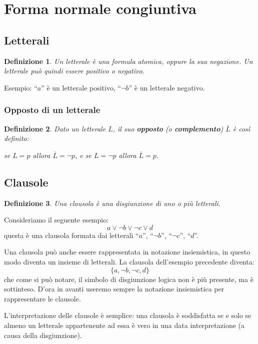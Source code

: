 \documentclass[a4paper,12pt]{report}
\newtheorem{definition}{Definizione}[section]
\begin{document}
\section{Forma normale congiuntiva}
\label{CNF}
\subsection{Letterali}

\begin{definition}
    Un letterale è una formula atomica, oppure la sua negazione. Un letterale può quindi essere positivo o negativo.
\end{definition}
Esempio: ``$a$'' è un letterale positivo, ``$\lnot b$'' è un letterale negativo.

\subsubsection{Opposto di un letterale}
\begin{definition}
    Dato un letterale $L$, il suo \textbf{opposto} (o \textbf{complemento}) $\overline{L}$ è così definito:

    se $L = p$ allora $\overline{L} = \lnot p$, e se $L = \lnot p$ allora $\overline{L} = p$.
\end{definition}

\subsection{Clausole}
\begin{definition}
    Una clausola è una disgiunzione di uno o più letterali.
\end{definition}
\noindent Consideriamo il seguente esempio:
\[ a \lor \lnot b \lor \lnot c \lor d \] 
questa è una clausola formata dai letterali ``$a$'', ``$\lnot b$'', ``$\lnot c$'', ``$d$''.

Una clausola può anche essere rappresentata in notazione insiemistica, in questo modo diventa un insieme di letterali. La clausola dell'esempio precedente diventa:
\[ \{a, \lnot b, \lnot c, d\}\]
che come si può notare, il simbolo di disgiunzione logica non è più presente, ma è sottinteso. D'ora in avanti useremo sempre la notazione insiemistica per rappresentare le clausole.

L'interpretazione delle clausole è semplice: una clausola è soddisfatta se e solo se almeno un letterale appartenente ad essa è vero in una data interpretazione (a causa della disgiunzione).
\end{document}
